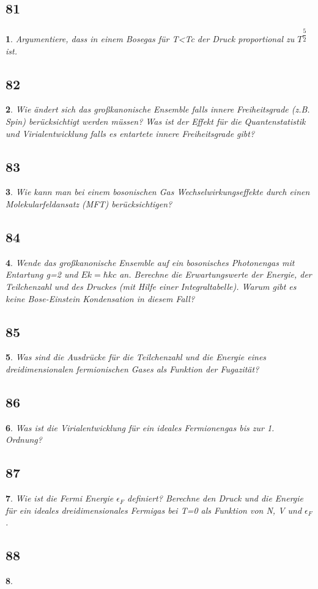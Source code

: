 \documentclass[12pt,a4paper]{report}
\newtheorem{myfrag}{}%
\begin{document}
\subsection{81}
\begin{myfrag}
Argumentiere, dass in einem Bosegas für T<Tc der Druck proportional zu $T^{\dfrac{5}{2}}$
ist.
\end{myfrag}
\subsection{82}
\begin{myfrag}
Wie ändert sich das großkanonische Ensemble falls innere Freiheitsgrade
(z.B. Spin) berücksichtigt werden müssen? Was ist der Effekt für die
Quantenstatistik und Virialentwicklung falls es entartete innere Freiheitsgrade
gibt?
\end{myfrag}
\subsection{83}
\begin{myfrag}
Wie kann man bei einem bosonischen Gas Wechselwirkungseffekte durch
einen Molekularfeldansatz (MFT) berücksichtigen?
\end{myfrag}
\subsection{84}
\begin{myfrag}
Wende das großkanonische Ensemble auf ein bosonisches Photonengas mit
Entartung g=2 und $Ek=\hbar kc$ an. Berechne die Erwartungswerte der Energie,
der Teilchenzahl und des Druckes (mit Hilfe einer Integraltabelle). Warum
gibt es keine Bose-Einstein Kondensation in diesem Fall?
\end{myfrag}
\subsection{85}
\begin{myfrag}
Was sind die Ausdrücke für die Teilchenzahl und die Energie eines
dreidimensionalen fermionischen Gases als Funktion der Fugazität?
\end{myfrag}
\subsection{86}
\begin{myfrag}
Was ist die Virialentwicklung für ein ideales Fermionengas bis zur 1.
Ordnung?
\end{myfrag}
\subsection{87}
\begin{myfrag}
Wie ist die Fermi Energie $\epsilon _F$ definiert? Berechne den Druck und die Energie
für ein ideales dreidimensionales Fermigas bei T=0 als Funktion von N, V
und $\epsilon _F$.
\end{myfrag}
\subsection{88}
\begin{myfrag}
\end{myfrag}
\end{document}
